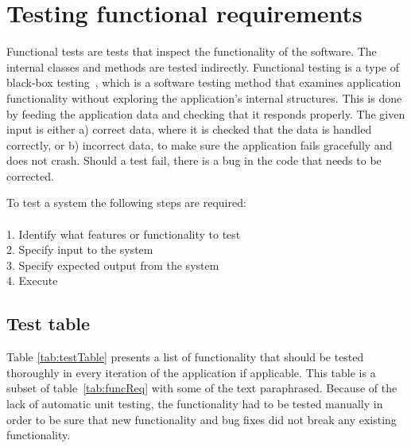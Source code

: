 \newpage
\section{Testing functional requirements}
\label{sec:funcTest}
Functional tests are tests that inspect the functionality of the software. The internal classes and methods are tested indirectly. Functional testing is a type of black-box testing~\cite{blackbox}, which is a software testing method that examines application functionality without exploring the application's internal structures. This is done by feeding the application data and checking that it responds properly. The given input is either a) correct data, where it is checked that the data is handled correctly, or b) incorrect data, to make sure the application fails gracefully and does not crash. Should a test fail, there is a bug in the code that needs to be corrected.

To test a system the following steps are required:\\\\
1. Identify what features or functionality to test\\
2. Specify input to the system\\
3. Specify expected output from the system\\
4. Execute

\subsection{Test table}
Table \ref{tab:testTable} presents a list of functionality that should be tested thoroughly in every iteration of the application if applicable. This table is a subset of table~\ref{tab:funcReq} with some of the text paraphrased. Because of the lack of automatic unit testing, the functionality had to be tested manually in order to be sure that new functionality and bug fixes did not break any existing functionality.

